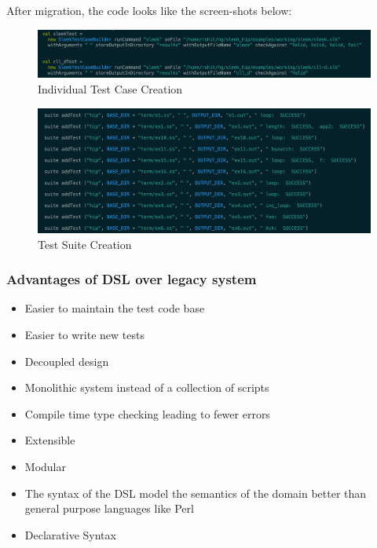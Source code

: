 \noindent
After migration, the code looks like the screen-shots below:

\begin{figure}[H]
  \centering
    \includegraphics[width=500px]{figures/DSL_create_test.png}
  \caption{Individual Test Case Creation}
\end{figure}

\begin{figure}[H]
  \centering
    \includegraphics[width=500px]{figures/DSL_test_suite.png}
  \caption{Test Suite Creation}
\end{figure}

\subsubsection{Advantages of DSL over legacy system}
\begin{itemize}
\item Easier to maintain the test code base
\item Easier to write new tests
\item Decoupled design
\item Monolithic system instead of a collection of scripts
\item Compile time type checking leading to fewer errors
\item Extensible
\item Modular
\item The syntax of the DSL model the semantics of the domain better than general purpose languages like Perl
\item Declarative Syntax
\end{itemize}

